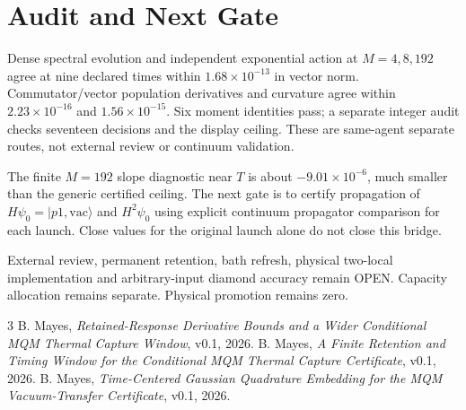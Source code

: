 \documentclass[a4paper,journal]{IEEEtran}
\begin{document}
\section{Audit and Next Gate}
Dense spectral evolution and independent exponential action at $M=4,8,192$ agree at nine declared times within $1.68\times10^{-13}$ in vector norm. Commutator/vector population derivatives and curvature agree within $2.23\times10^{-16}$ and $1.56\times10^{-15}$. Six moment identities pass; a separate integer audit checks seventeen decisions and the display ceiling. These are same-agent separate routes, not external review or continuum validation.

The finite $M=192$ slope diagnostic near $T$ is about $-9.01\times10^{-6}$, much smaller than the generic certified ceiling. The next gate is to certify propagation of $H\psi_0=|p1,\mathrm{vac}\rangle$ and $H^2\psi_0$ using explicit continuum propagator comparison for each launch. Close values for the original launch alone do not close this bridge.

External review, permanent retention, bath refresh, physical two-local implementation and arbitrary-input diamond accuracy remain OPEN. Capacity allocation remains separate. Physical promotion remains zero.
\begin{thebibliography}{3}
 B. Mayes, \emph{Retained-Response Derivative Bounds and a Wider Conditional MQM Thermal Capture Window}, v0.1, 2026.
 B. Mayes, \emph{A Finite Retention and Timing Window for the Conditional MQM Thermal Capture Certificate}, v0.1, 2026.
 B. Mayes, \emph{Time-Centered Gaussian Quadrature Embedding for the MQM Vacuum-Transfer Certificate}, v0.1, 2026.
\end{thebibliography}
\end{document}
